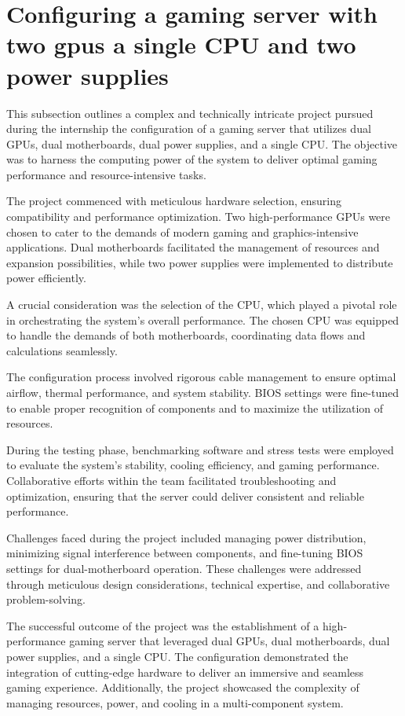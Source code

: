 \section{Configuring a gaming server with two gpus a single CPU and two
power supplies}
This subsection outlines a complex and technically intricate project pursued during the internship  the configuration of a gaming server that utilizes dual GPUs, dual motherboards, dual power supplies, and a single CPU. The objective was to harness the computing power of the system to deliver optimal gaming performance and resource-intensive tasks.

The project commenced with meticulous hardware selection, ensuring compatibility and performance optimization. Two high-performance GPUs were chosen to cater to the demands of modern gaming and graphics-intensive applications. Dual motherboards facilitated the management of resources and expansion possibilities, while two power supplies were implemented to distribute power efficiently.

A crucial consideration was the selection of the CPU, which played a pivotal role in orchestrating the system's overall performance. The chosen CPU was equipped to handle the demands of both motherboards, coordinating data flows and calculations seamlessly.

The configuration process involved rigorous cable management to ensure optimal airflow, thermal performance, and system stability. BIOS settings were fine-tuned to enable proper recognition of components and to maximize the utilization of resources.

During the testing phase, benchmarking software and stress tests were employed to evaluate the system's stability, cooling efficiency, and gaming performance. Collaborative efforts within the team facilitated troubleshooting and optimization, ensuring that the server could deliver consistent and reliable performance.

Challenges faced during the project included managing power distribution, minimizing signal interference between components, and fine-tuning BIOS settings for dual-motherboard operation. These challenges were addressed through meticulous design considerations, technical expertise, and collaborative problem-solving.

The successful outcome of the project was the establishment of a high-performance gaming server that leveraged dual GPUs, dual motherboards, dual power supplies, and a single CPU. The configuration demonstrated the integration of cutting-edge hardware to deliver an immersive and seamless gaming experience. Additionally, the project showcased the complexity of managing resources, power, and cooling in a multi-component system.
